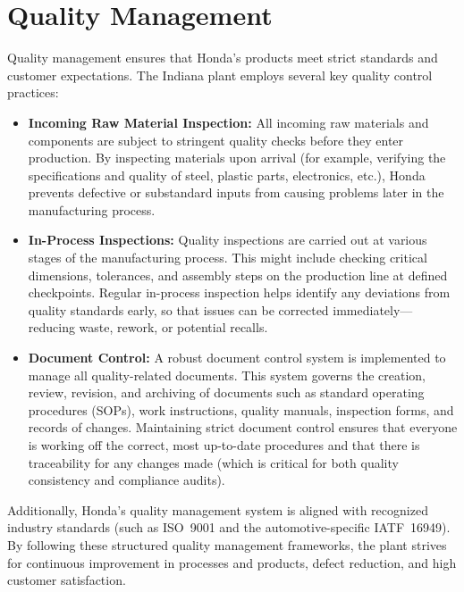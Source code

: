 \section{Quality Management}
Quality management ensures that Honda's products meet strict standards and customer expectations. The Indiana plant employs several key quality control practices:
\begin{itemize}
    \item \textbf{Incoming Raw Material Inspection:} All incoming raw materials and components are subject to stringent quality checks before they enter production. By inspecting materials upon arrival (for example, verifying the specifications and quality of steel, plastic parts, electronics, etc.), Honda prevents defective or substandard inputs from causing problems later in the manufacturing process.
    \item \textbf{In-Process Inspections:} Quality inspections are carried out at various stages of the manufacturing process. This might include checking critical dimensions, tolerances, and assembly steps on the production line at defined checkpoints. Regular in-process inspection helps identify any deviations from quality standards early, so that issues can be corrected immediately---reducing waste, rework, or potential recalls.
    \item \textbf{Document Control:} A robust document control system is implemented to manage all quality-related documents. This system governs the creation, review, revision, and archiving of documents such as standard operating procedures (SOPs), work instructions, quality manuals, inspection forms, and records of changes. Maintaining strict document control ensures that everyone is working off the correct, most up-to-date procedures and that there is traceability for any changes made (which is critical for both quality consistency and compliance audits).
\end{itemize}

Additionally, Honda’s quality management system is aligned with recognized industry standards (such as ISO~9001 and the automotive-specific IATF~16949). By following these structured quality management frameworks, the plant strives for continuous improvement in processes and products, defect reduction, and high customer satisfaction.

